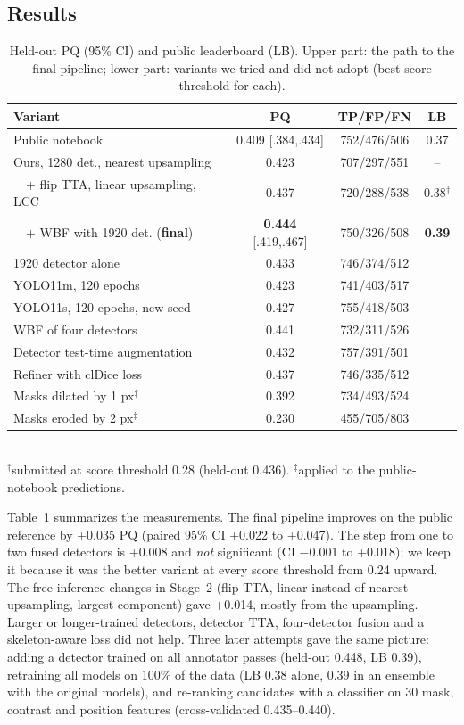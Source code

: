\documentclass[sigconf]{acmart}
\begin{document}
\subsection{Results}
\begin{table}[t]
  \caption{Held-out PQ (95\% CI) and public leaderboard (LB). Upper part: the path to the final pipeline; lower part: variants we tried and did not adopt (best score threshold for each).}
  \label{tab:ablation}
  \small
  \setlength{\tabcolsep}{3pt}
  \begin{tabular}{lccc}
    \toprule
    Variant & PQ & TP/FP/FN & LB \\
    \midrule
    Public notebook \cite{gluhkikh2026notebook} & 0.409 {\scriptsize[.384,.434]} & 752/476/506 & 0.37 \\
    Ours, 1280 det., nearest upsampling & 0.423 & 707/297/551 & -- \\
    \ \ + flip TTA, linear upsampling, LCC & 0.437 & 720/288/538 & 0.38$^\dagger$ \\
    \ \ + WBF with 1920 det. (\textbf{final}) & \textbf{0.444} {\scriptsize[.419,.467]} & 750/326/508 & \textbf{0.39} \\
    \midrule
    1920 detector alone & 0.433 & 746/374/512 & \\
    YOLO11m, 120 epochs & 0.423 & 741/403/517 & \\
    YOLO11s, 120 epochs, new seed & 0.427 & 755/418/503 & \\
    WBF of four detectors & 0.441 & 732/311/526 & \\
    Detector test-time augmentation & 0.432 & 757/391/501 & \\
    Refiner with clDice loss \cite{shit2021cldice} & 0.437 & 746/335/512 & \\
    Masks dilated by 1 px$^\ddagger$ & 0.392 & 734/493/524 & \\
    Masks eroded by 2 px$^\ddagger$ & 0.230 & 455/705/803 & \\
    \bottomrule
  \end{tabular}\\[2pt]
  {\scriptsize $^\dagger$submitted at score threshold 0.28 (held-out 0.436). $^\ddagger$applied to the public-notebook predictions.}
\end{table}

Table~\ref{tab:ablation} summarizes the measurements. The final pipeline improves on the public reference by +0.035 PQ (paired 95\% CI +0.022 to +0.047). The step from one to two fused detectors is +0.008 and \emph{not} significant (CI $-$0.001 to +0.018); we keep it because it was the better variant at every score threshold from 0.24 upward. The free inference changes in Stage~2 (flip TTA, linear instead of nearest upsampling, largest component) gave +0.014, mostly from the upsampling. Larger or longer-trained detectors, detector TTA, four-detector fusion and a skeleton-aware loss did not help. Three later attempts gave the same picture: adding a detector trained on all annotator passes (held-out 0.448, LB 0.39), retraining all models on 100\% of the data (LB 0.38 alone, 0.39 in an ensemble with the original models), and re-ranking candidates with a classifier on 30 mask, contrast and position features (cross-validated 0.435--0.440).
\end{document}
